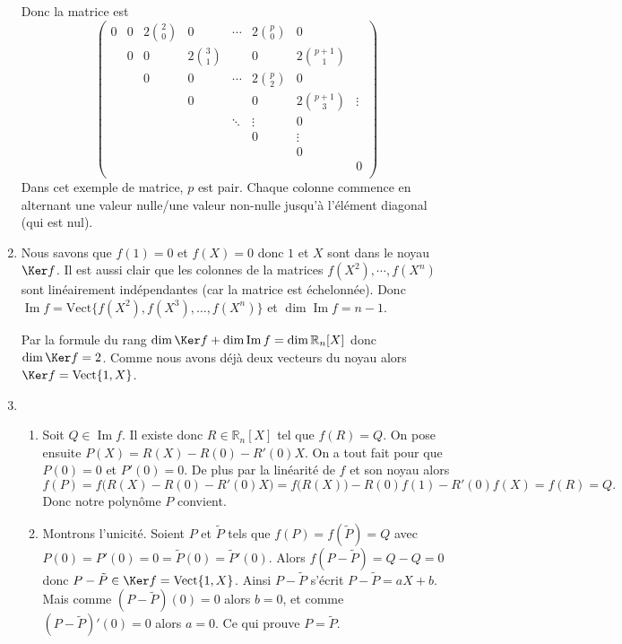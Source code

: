 \documentclass[11pt,a4paper]{article}
\newcommand{\Rr}{\mathbb{R}} \newcommand{\R}{\mathbb{R}}
\renewcommand{\Im}{\mathop{\mathrm{Im}}\nolimits}
\begin{document}
\begin{enumerate}
Donc la matrice est 
$$\begin{pmatrix} 
0 & 0 & 2\binom{2}{0} & 0             & \cdots & 2\binom{p}{0} & 0               &        \\
  & 0 & 0             & 2\binom{3}{1} &        & 0             & 2\binom{p+1}{1} &        \\
  &   & 0             & 0             & \cdots & 2\binom{p}{2} & 0               &        \\
  &   &               & 0             &        & 0             & 2\binom{p+1}{3} & \vdots \\  
  &   &               &               & \ddots & \vdots        & 0               &        \\
  &   &               &               &        & 0             & \vdots          &        \\
  &   &               &               &        &               & 0               &        \\
  &   &               &               &        &               &                 & 0      \\
  \end{pmatrix}$$
Dans cet exemple de matrice, $p$ est pair.
Chaque colonne commence en alternant une valeur nulle/une valeur non-nulle 
jusqu'à l'élément diagonal (qui est nul).


  \item Nous savons que $f(1)=0$ et $f(X)=0$ donc $1$ et $X$ sont dans le noyau $\Ker f$.
Il est aussi clair que les colonnes de la matrices $f(X^2),\cdots, f(X^n)$ sont linéairement indépendantes
(car la matrice est échelonnée). Donc $\Im f = \textrm{Vect}\{f(X^2),f(X^3),\ldots,f(X^n)\}$ 
et $\dim \Im f = n-1$.

Par la formule du rang $\dim \Ker f + \dim \Im f = \dim \Rr_n[X]$ donc
$\dim \Ker f = 2$. Comme nous avons déjà deux vecteurs du noyau alors 
$\Ker f =  \textrm{Vect}\{1,X\}$.

   \item 
   \begin{enumerate}
      \item Soit $Q \in \Im f$. Il existe donc $R\in\Rr_n[X]$ tel que $f(R)=Q$.
On pose ensuite $P(X)=R(X)-R(0)-R'(0)X$.
On a tout fait pour que $P(0)=0$ et $P'(0)=0$.
De plus par la linéarité de $f$ et son noyau alors
$$f(P)= f\big( R(X)-R(0)-R'(0)X\big) = f\big( R(X)\big)-R(0)f(1) -R'(0)f(X)=f(R)=Q.$$
Donc notre polynôme $P$ convient.

      \item Montrons l'unicité. Soient $P$ et $\tilde P$ tels que $f(P)=f(\tilde P)=Q$
avec $P(0)=P'(0)=0 = \tilde P(0)=\tilde P'(0)$.
Alors  $f(P-\tilde P) = Q-Q=0$ donc $P-\tilde P \in \Ker f = \textrm{Vect}\{1,X\}$.
Ainsi $P-\tilde P$ s'écrit $P-\tilde P = aX+b$. Mais comme $(P-\tilde P)(0)=0$ alors 
$b=0$, et comme  $(P-\tilde P)'(0)=0$ alors $a=0$. Ce qui prouve $P = \tilde P$.

    \end{enumerate}
\end{enumerate}
\end{document}
